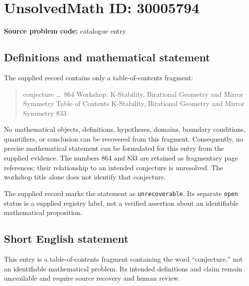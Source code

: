\documentclass[11pt]{article}
\begin{document}
\section*{UnsolvedMath ID: 30005794}
\textbf{Source problem code:} catalogue entry
\subsection{Definitions and mathematical statement}
The supplied record contains only a table-of-contents fragment:
\begin{quote}
conjecture \dots\ 864 Workshop: K-Stability, Birational Geometry and Mirror Symmetry Table of Contents K-Stability, Birational Geometry and Mirror Symmetry 833
\end{quote}
No mathematical objects, definitions, hypotheses, domains, boundary conditions, quantifiers, or conclusion can be recovered from this fragment. Consequently, no precise mathematical statement can be formulated for this entry from the supplied evidence. The numbers 864 and 833 are retained as fragmentary page references; their relationship to an intended conjecture is unresolved. The workshop title alone does not identify that conjecture.

The supplied record marks the statement as \texttt{unrecoverable}. Its separate \texttt{open} status is a supplied registry label, not a verified assertion about an identifiable mathematical proposition.
\subsection{Short English statement}
This entry is a table-of-contents fragment containing the word ``conjecture,'' not an identifiable mathematical problem. Its intended definitions and claim remain unavailable and require source recovery and human review.
\end{document}
